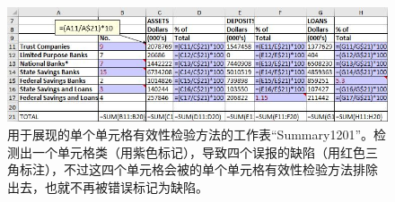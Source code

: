 \begin{figure}[tp]
    \centering
    \includegraphics[width=\columnwidth]{figure/figure2.png}
    \caption{用于展现\wa 的单个单元格有效性检验方法的工作表``Summary1201''。\cu 检测出一个单元格类（用紫色标记），导致四个误报的缺陷（用红色三角标注），不过这四个单元格会被\wa 的单个单元格有效性检验方法排除出去，也就不再被错误标记为缺陷。}
    \label{figure2}
\end{figure}